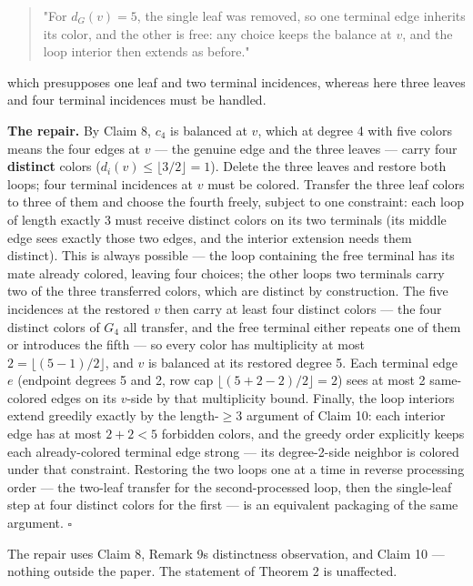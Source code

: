 \documentclass[11pt]{article}
\theoremstyle{definition}
\theoremstyle{remark}
\begin{document}
\begin{quote}
"For \(d_G(v)=5\), the single leaf was removed, so one terminal edge inherits its color, and the other is free: any choice keeps the balance at \(v\), and the loop interior then extends as before."
\end{quote}

which presupposes one leaf and two terminal incidences, whereas here three leaves and four terminal incidences must be handled.

\textbf{The repair.} By Claim 8, \(c_4\) is balanced at \(v\), which at degree 4 with five colors means the four edges at \(v\) --- the genuine edge and the three leaves --- carry four \textbf{distinct} colors (\(d_i(v) \le \lfloor 3/2 \rfloor = 1\)). Delete the three leaves and restore both loops; four terminal incidences at \(v\) must be colored. Transfer the three leaf colors to three of them and choose the fourth freely, subject to one constraint: each loop of length exactly 3 must receive distinct colors on its two terminals (its middle edge sees exactly those two edges, and the interior extension needs them distinct). This is always possible --- the loop containing the free terminal has its mate already colored, leaving four choices; the other loop\textquotesingle s two terminals carry two of the three transferred colors, which are distinct by construction. The five incidences at the restored \(v\) then carry at least four distinct colors --- the four distinct colors of \(G_4\) all transfer, and the free terminal either repeats one of them or introduces the fifth --- so every color has multiplicity at most \(2 = \lfloor (5-1)/2 \rfloor\), and \(v\) is balanced at its restored degree 5. Each terminal edge \(e\) (endpoint degrees 5 and 2, row cap \(\lfloor (5+2-2)/2 \rfloor = 2\)) sees at most 2 same-colored edges on its \(v\)-side by that multiplicity bound. Finally, the loop interiors extend greedily exactly by the length-\(\ge 3\) argument of Claim 10: each interior edge has at most \(2 + 2 < 5\) forbidden colors, and the greedy order explicitly keeps each already-colored terminal edge strong --- its degree-2-side neighbor is colored under that constraint. Restoring the two loops one at a time in reverse processing order --- the two-leaf transfer for the second-processed loop, then the single-leaf step at four distinct colors for the first --- is an equivalent packaging of the same argument. \(\square\)

The repair uses Claim 8, Remark 9\textquotesingle s distinctness observation, and Claim 10 --- nothing outside the paper. The statement of Theorem 2 is unaffected.
\end{document}
